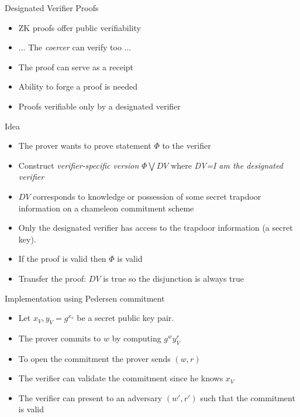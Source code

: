 \documentclass{beamer}
\begin{document}
\begin{frame}[allowframebreaks]{Designated Verifier Proofs \cite{JSI96}}

\begin{itemize}
\item ZK proofs offer public verifiability
\item ... The \textit{coercer} can verify too ...
\item The proof can serve as a receipt
\item Ability to forge a proof is needed
\item Proofs verifiable only by a designated verifier
\end{itemize}

\begin{block}{Idea}
 
\begin{itemize}
\item The prover wants to prove statement $\Phi$ to the verifier
\item Construct \textit{verifier-specific version} $\Phi \bigvee DV$ where \textit{DV=I am the designated verifier}
\item $DV$ corresponds to knowledge or possession of some secret trapdoor information on a chameleon commitment scheme
\item Only the designated verifier has access to the trapdoor information (a secret key).
\item If the proof is valid then $\Phi$ is valid
\item Transfer the proof: $DV$ is true so the disjunction is always true
\end{itemize}
\end{block}

\framebreak

\begin{block}{Implementation using Pedersen commitment}
\begin{itemize}
\item Let $x_V, y_V=g^{x_v}$ be a secret public key pair.
\item The prover commits to $w$ by computing $g^w y_V^{r}$
\item To open the commitment the prover sends $(w,r)$ 
\item The verifier can validate the commitment since he knows $x_V$
\item The verifier can present to an adversary $(w',r')$ such that the commitment is valid
\end{itemize}
\end{block}

\end{frame}
\end{document}
